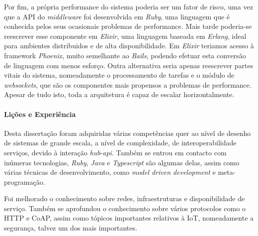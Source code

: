Por fim, a própria performance do sistema poderia ser um fator de risco, uma vez que a API do \textit{middleware} foi desenvolvida em \textit{Ruby}, uma linguagem que é conhecida pelos seus ocasionais problemas de performance. Mais tarde poderia-se reescrever esse componente em \textit{Elixir}, uma linguagem baseada em \textit{Erlang}, ideal para ambientes distribuidos e de alta disponibilidade. Em \textit{Elixir} teriamos acesso à framework \textit{Phoenix}, muito semelhante ao \textit{Rails}, podendo efetuar esta conversão de linguagem com menos esforço. Outra alternativa seria apenas reescrever partes vitais do sistema, nomeadamente o processamento de tarefas e o módulo de \textit{websockets}, que são os componentes mais propensos a problemas de performance. Apesar de tudo isto, toda a arquitetura é capaz de escalar horizontalmente.

\paragraph*{Lições e Experiência}

Desta dissertação foram adquiridas várias competências quer ao nível de desenho de sistemas de grande escala, a nível de complexidade, de interoperabilidade serviços, devido à interação \textit{hub}-\textit{api}. Também se entrou em contacto com inúmeras tecnologias, \textit{Ruby}, \textit{Java} e \textit{Typescript} são algumas delas, assim como várias técnicas de desenvolvimento, como \textit{model driven development} e meta-programação.

Foi melhorado o conhecimento sobre redes, infraestruturas e disponibilidade de serviço. Também se aprofundou o conhecimento sobre vários protocolos como o HTTP e CoAP, assim como tópicos importantes relativos à IoT, nomeadamente a segurança, talvez um dos mais importantes.
